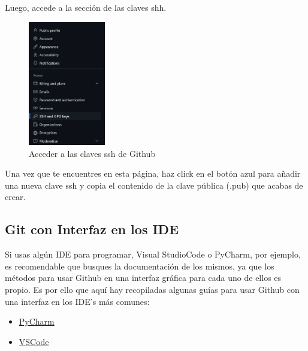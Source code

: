 \documentclass[]{article}
\begin{document}
\begin{enumerate}
    Luego, accede a la sección de las claves shh.
    \begin{figure}[H]
        \centering
        \includegraphics[width=0.3\textwidth]{./static/github_2.png}
        \caption{Acceder a las claves ssh de Github}
    \end{figure}

    Una vez que te encuentres en esta página, haz click en el botón azul para añadir una nueva clave ssh y copia el contenido de la clave pública (.pub) que acabas de crear.
\end{enumerate}

\subsection{Git con Interfaz en los IDE}
Si usas algún IDE para programar, Visual StudioCode o PyCharm, por ejemplo, es recomendable que busques la documentación de los mismos, ya que los métodos para usar Github en una interfaz gráfica para cada uno de ellos es propio. Es por ello que aquí hay recopiladas algunas guías para usar Github con una interfaz en los IDE's más comunes:

\begin{itemize}
    \item \textcolor{blue}{\href{https://www.jetbrains.com/help/pycharm/github.html}{PyCharm}}
    \item \textcolor{blue}{\href{https://code.visualstudio.com/docs/sourcecontrol/github}{VSCode}}
\end{itemize}
\end{document}
